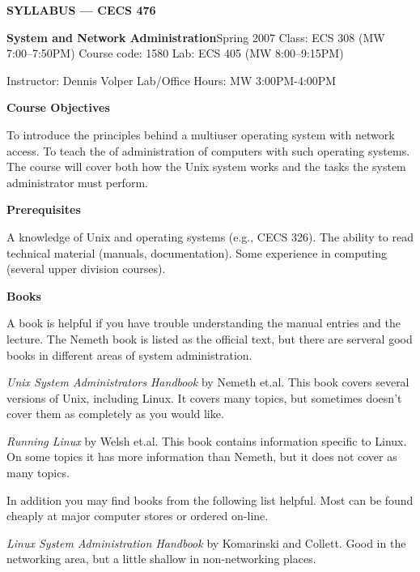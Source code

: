 
\centerline{{\bf SYLLABUS --- CECS 476}}
\vskip 5pt
{\obeylines\parindent 0pt
{\bf System and Network Administration}\hfill Spring 2007
Class: ECS 308 (MW 7:00--7:50PM) \hfill Course code: 1580 \hfill Lab: ECS 405 (MW 8:00--9:15PM)

Instructor: Dennis Volper \hfill Lab/Office Hours: MW 3:00PM-4:00PM

}
 
\vskip 5pt
\centerline{\bf Course Objectives}
 
To introduce the principles behind a multiuser operating system with network
access.
To teach the of administration of computers with such operating systems.
The course will cover both how the Unix system works
and the tasks the system administrator must perform.

\vskip 5pt
\centerline{\bf Prerequisites }

A knowledge of Unix and operating systems (e.g., CECS 326).
The ability to read technical material (manuals, documentation).
Some experience in computing (several upper division courses).
 
\vskip 5pt
\centerline{\bf Books }
 
A book is helpful if you have trouble understanding the manual entries
and the lecture.
The Nemeth book is listed as the official text, but there are serveral
good books in different areas of system administration.

{\it Unix System Administrators Handbook}
by Nemeth et.al.
This book covers several versions of Unix, including Linux.
It covers many topics, but sometimes doesn't cover them
as completely as you would like.

{\it Running Linux}
by Welsh et.al.
This book contains information specific to Linux.
On some topics it has more information than Nemeth,
but it does not cover as many topics.

In addition you may find books from the following list helpful. 
Most can be found cheaply at major
computer stores or ordered on-line.


{\it Linux System Administration Handbook}
by Komarinski and Collett. 
Good in the networking area, 
but a little shallow in non-networking places.

